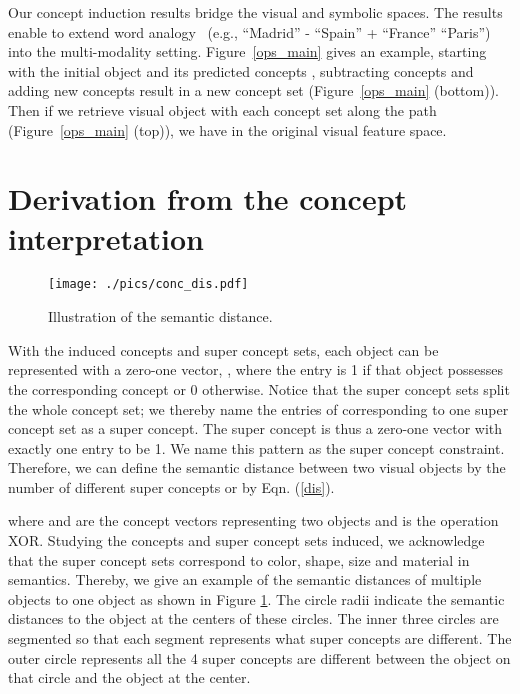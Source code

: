 \documentclass[10pt,twocolumn,letterpaper]{article}
\begin{document}
Our concept induction results bridge the visual and symbolic spaces. The results enable to extend word analogy~\cite{mikolov2013distributed} (e.g., ``Madrid'' - ``Spain'' + ``France''  ``Paris'') into the multi-modality setting.
Figure~\ref{ops_main} gives an example, starting with the initial object  and its predicted concepts , subtracting concepts  and adding new concepts  result in a new concept set  (Figure~\ref{ops_main} (bottom)). Then if we retrieve visual object  with each concept set  along the path (Figure~\ref{ops_main} (top)), we have  in the original visual feature space.

\section{Derivation from the concept interpretation}
\label{app:concept_dis}

\label{app:visualization}
\begin{figure}[h]
\centering
\texttt{[image: ./pics/conc\_dis.pdf]}
\caption{Illustration of the semantic distance.}
\label{conc_dis}
\end{figure}

With the induced concepts and super concept sets, each object can be represented with a zero-one vector, , where the entry is 1 if that object possesses the corresponding concept or 0 otherwise. Notice that the super concept sets split the whole concept set; we thereby name the entries of  corresponding to one super concept set as a super concept. The super concept is thus a zero-one vector with exactly one entry to be 1. We name this pattern as the super concept constraint. Therefore, we can define the semantic distance between two visual objects by the number of different super concepts or by Eqn. (\ref{dis}). 

where  and  are the concept vectors representing two objects and  is the operation XOR. Studying the concepts and super concept sets induced, we acknowledge that the super concept sets correspond to color, shape, size and material in semantics. Thereby, we give an example of the semantic distances of multiple objects to one object as shown in Figure \ref{conc_dis}. The circle radii indicate the semantic distances to the object at the centers of these circles. The inner three circles are segmented so that each segment represents what super concepts are different. The outer circle represents all the 4 super concepts are different between the object on that circle and the object at the center.
\end{document}

